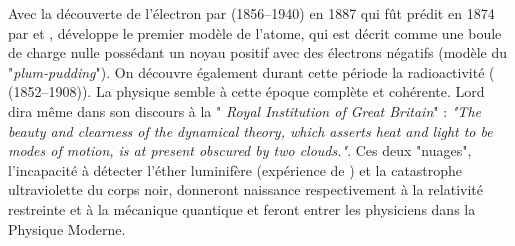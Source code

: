 Avec la découverte de l'électron par  (\num{1856}--\num{1940}) en \num{1887} qui fût prédit en \num{1874} par  et ,  développe le premier modèle de l'atome, qui est décrit comme une boule de charge nulle possédant un noyau positif avec des électrons négatifs (modèle du "\textit{plum-pudding}"). On découvre également durant cette période la radioactivité ( (\num{1852}--\num{1908})). La physique semble à cette époque complète et cohérente. Lord  dira même dans son discours à la " \textit{Royal Institution of Great Britain}" : \textit{"The beauty and clearness of the dynamical theory, which asserts heat and light to be modes of motion, is at present obscured by two clouds."}. Ces deux "nuages", l'incapacité à détecter l'éther luminifère  (expérience de ) et la catastrophe ultraviolette du corps noir, donneront naissance respectivement à la relativité restreinte et à la mécanique quantique et feront entrer les physiciens dans la Physique Moderne.

